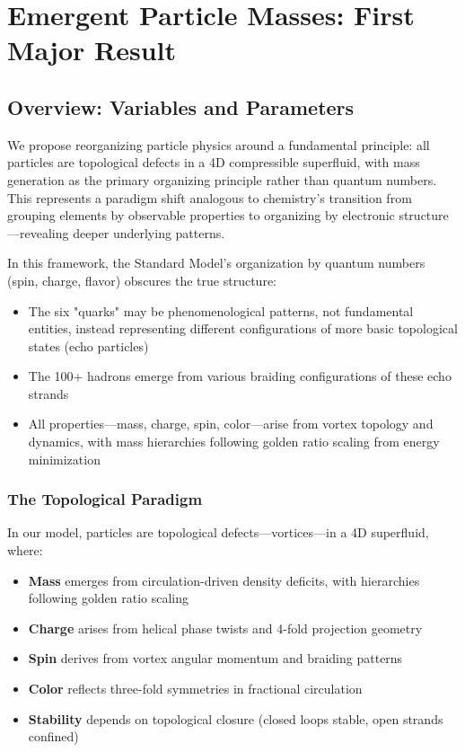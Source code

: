 \section{Emergent Particle Masses: First Major Result}

\subsection{Overview: Variables and Parameters}

We propose reorganizing particle physics around a fundamental principle: all particles are topological defects in a 4D compressible superfluid, with mass generation as the primary organizing principle rather than quantum numbers. This represents a paradigm shift analogous to chemistry's transition from grouping elements by observable properties to organizing by electronic structure—revealing deeper underlying patterns.

In this framework, the Standard Model's organization by quantum numbers (spin, charge, flavor) obscures the true structure:
\begin{itemize}
\item The six "quarks" may be phenomenological patterns, not fundamental entities, instead representing different configurations of more basic topological states (echo particles)
\item The 100+ hadrons emerge from various braiding configurations of these echo strands
\item All properties—mass, charge, spin, color—arise from vortex topology and dynamics, with mass hierarchies following golden ratio scaling from energy minimization
\end{itemize}

\subsubsection{The Topological Paradigm}

In our model, particles are topological defects—vortices—in a 4D superfluid, where:
\begin{itemize}
\item \textbf{Mass} emerges from circulation-driven density deficits, with hierarchies following golden ratio scaling
\item \textbf{Charge} arises from helical phase twists and 4-fold projection geometry
\item \textbf{Spin} derives from vortex angular momentum and braiding patterns
\item \textbf{Color} reflects three-fold symmetries in fractional circulation
\item \textbf{Stability} depends on topological closure (closed loops stable, open strands confined)
\end{itemize}


